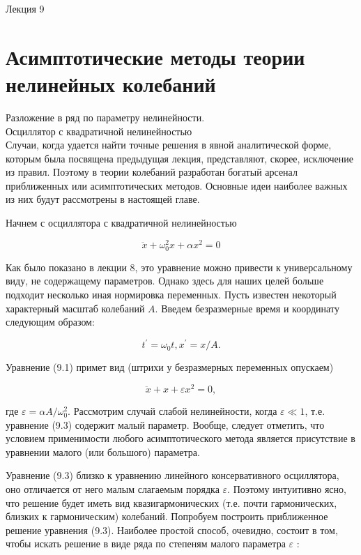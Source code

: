 \documentclass[10pt]{article}
\begin{document}
Лекция 9

\section*{Асимптотические методы теории нелинейных колебаний}
Разложение в ряд по параметру нелинейности.\\
Осциллятор с квадратичной нелинейностью\\
Случаи, когда удается найти точные решения в явной аналитической форме, которым была посвящена предыдущая лекция, представляют, скорее, исключение из правил. Поэтому в теории колебаний разработан богатый арсенал приближенных или асимптотических методов. Основные идеи наиболее важных из них будут рассмотрены в настоящей главе.

Начнем с осциллятора с квадратичной нелинейностью


\begin{equation*}
\ddot{x}+\omega_{0}^{2} x+\alpha x^{2}=0 \tag{9.1}
\end{equation*}


Как было показано в лекции 8, это уравнение можно привести к универсальному виду, не содержащему параметров. Однако здесь для наших целей больше подходит несколько иная нормировка переменных. Пусть известен некоторый характерный масштаб колебаний $A$. Введем безразмерные время и координату следующим образом:


\begin{equation*}
t^{\prime}=\omega_{0} t, x^{\prime}=x / A . \tag{9.2}
\end{equation*}


Уравнение (9.1) примет вид (штрихи у безразмерных переменных опускаем)


\begin{equation*}
\ddot{x}+x+\varepsilon x^{2}=0, \tag{9.3}
\end{equation*}


где $\varepsilon=\alpha A / \omega_{0}^{2}$. Рассмотрим случай слабой нелинейности, когда $\varepsilon \ll 1$, т.е. уравнение (9.3) содержит малый параметр. Вообще, следует отметить, что условием применимости любого асимптотического метода является присутствие в уравнении малого (или большого) параметра.

Уравнение (9.3) близко к уравнению линейного консервативного осциллятора, оно отличается от него малым слагаемым порядка $\varepsilon$. Поэтому интуитивно ясно, что решение будет иметь вид квазигармонических (т.е. почти гармонических, близких к гармоническим) колебаний. Попробуем построить приближенное решение уравнения (9.3). Наиболее простой способ, очевидно, состоит в том, чтобы искать решение в виде ряда по степеням малого параметра $\varepsilon$ :
\end{document}
